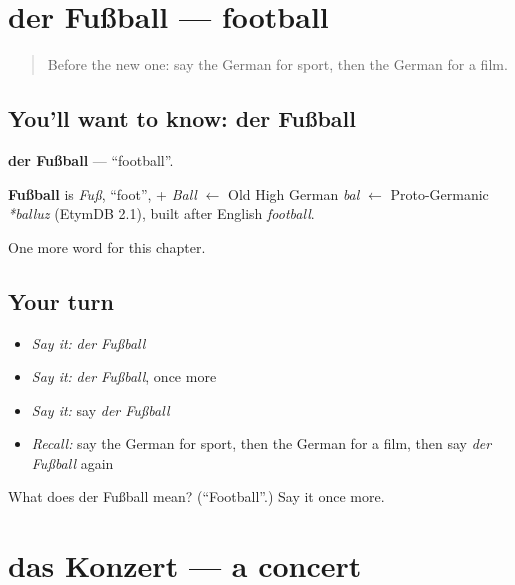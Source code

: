 \section[der Fußball]{der Fußball — football}

\label{lesson:GE-C129-fussball}



\begin{quote}
Before the new one: say the German for sport, then the German for a film.
\end{quote}

\subsection*{You'll want to know: der Fußball}
\textbf{der Fußball} — \textquotedblleft{}football\textquotedblright{}.

\begin{cousinweb}
\textbf{Fußball} is \emph{Fuß}, \textquotedblleft{}foot\textquotedblright{}, + \emph{Ball} $\leftarrow$ Old High German \emph{bal} $\leftarrow$ Proto-Germanic \emph{*balluz} (EtymDB 2.1), built after English \emph{football}.
\end{cousinweb}

\begin{grammarlens}[title={What you've built}]
One more word for this chapter.
\end{grammarlens}

\subsection*{Your turn}
\begin{itemize}
\raggedright
  \item \emph{Say it:} \emph{der Fußball}
  \item \emph{Say it:} \emph{der Fußball}, once more
  \item \emph{Say it:} say \emph{der Fußball}
  \item \emph{Recall:} say the German for sport, then the German for a film, then say \emph{der Fußball} again
\end{itemize}

\begin{tcolorbox}[breakable,colback=teal!4,colframe=teal!35!black,title={Before you move on}]
What does der Fußball mean? (\textquotedblleft{}Football\textquotedblright{}.) Say it once more.
\end{tcolorbox}
\section[das Konzert]{das Konzert — a concert}

